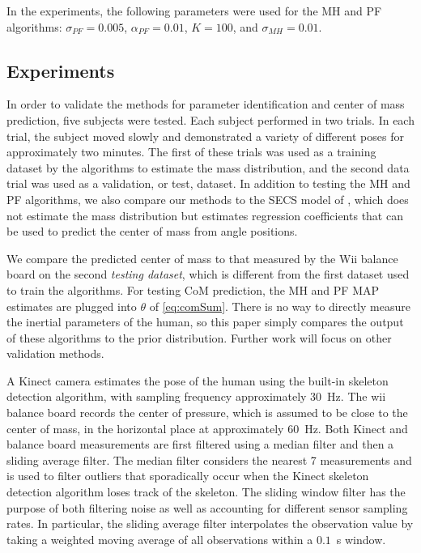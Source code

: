 In the experiments, the following parameters were used for the MH and PF algorithms: $\sigma_{PF} = 0.005$, $\alpha_{PF} = 0.01$, $K=100$, and $\sigma_{MH} = 0.01$.

\subsection{Experiments}
\label{experiments}
In order to validate the methods for parameter identification and center of mass prediction, five subjects were tested. 
Each subject performed in two trials. In each trial, the subject moved slowly and demonstrated a variety of different poses for approximately two minutes. 
The first of these trials was used as a training dataset by the algorithms to estimate the mass distribution, and the second data trial was used as a validation, or test, dataset. 
In addition to testing the MH and PF algorithms, we also compare our methods to the SECS model of \cite{gonzalez2012estimation}, which does not estimate the mass distribution but estimates regression coefficients that can be used to predict the center of mass from angle positions.

We compare the predicted center of mass to that measured by the Wii balance board on the second \emph{testing dataset}, which is different from the first dataset used to train the algorithms. For testing CoM prediction, the MH and PF MAP estimates are plugged into $\theta$ of \eqref{eq:comSum}. 
There is no way to directly measure the inertial parameters of the human, so this paper simply compares the output of these algorithms to the prior distribution. Further work will focus on other validation methods.

A Kinect camera estimates the pose of the human using the built-in skeleton detection algorithm, with sampling frequency approximately 30~Hz. The wii balance board records the center of pressure, which is assumed to be close to the center of mass, in the horizontal place at approximately 60~Hz. 
Both Kinect and balance board measurements are first filtered using a median filter and then a sliding average filter. The median filter considers the nearest 7 measurements and is used to filter outliers that sporadically occur when the Kinect skeleton detection algorithm loses track of the skeleton. The sliding window filter has the purpose of both filtering noise as well as accounting for different sensor sampling rates. In particular, the sliding average filter interpolates the observation value by taking a weighted moving average of all observations within a $0.1$~s window. %


